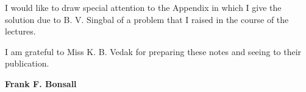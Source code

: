 I would like to draw special attention to the Appendix in which I give
the solution due to B. V. Singbal of a problem that I raised in the
course of the lectures.

I am grateful to Miss K. B. Vedak for preparing these notes and seeing
to their publication. 
\bigskip

\hfill{{\large\bf Frank F. Bonsall}}
